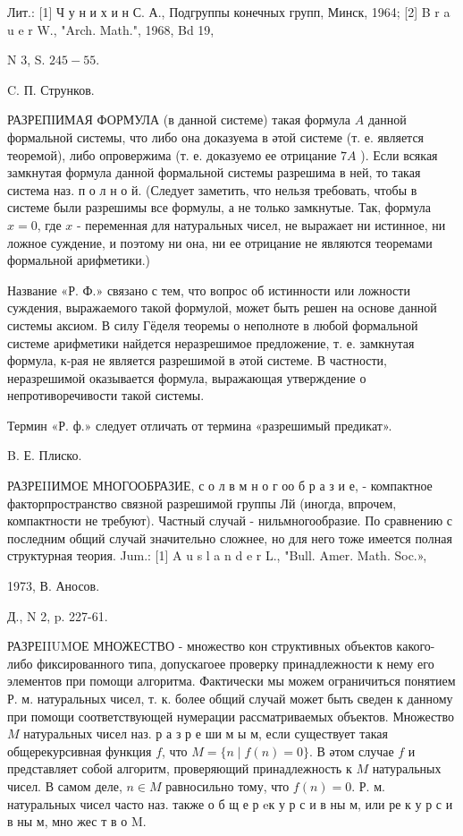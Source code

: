 \documentclass[10pt]{article}
\begin{document}
Лит.: [1] Ч у н и х и н С. А., Подгруппы конечных групп, Минск, 1964; [2] B r a u e r W., "Arch. Math.", 1968, Bd 19,

N 3, S. $245-55$.

C. П. Струнков.



РАЗРЕПІИМАЯ ФОРМУЛА (в данной системе) такая формула $A$ данной формальной системы, что либо она доказуема в әтой системе (т. е. является теоремой), либо опровержима (т. е. доказуемо ее отрицание $7 A$ ). Если всякая замкнутая формула данной формальной системы разрешима в ней, то такая система наз. п о л н о й. (Следует заметить, что нельзя требовать, чтобы в системе были разрешимы все формулы, а не только замкнутые. Так, формула $x=0$, где $x$ - переменная для натуральных чисел, не выражает ни истинное, ни ложное суждение, и поэтому ни она, ни ее отрицание не являются теоремами формальной арифметики.)



Название «Р. Ф.» связано с тем, что вопрос об истинности или ложности суждения, выражаемого такой формулой, может быть решен на основе данной системы аксиом. В силу Гёделя теоремы о неполноте в любой формальной системе арифметики найдется неразрешимое предложение, т. е. замкнутая формула, к-рая не является разрешимой в әтой системе. В частности, неразрешимой оказывается формула, выражающая утверждение о непротиворечивости такой системы.



Термин «Р. ф.» следует отличать от термина «разрешимый предикат».



B. Е. Плиско.



РАЗРЕIIИМОЕ МНОГООБРАЗИЕ, с о л в м н о г оо б р а з и е, - компактное факторпространство связной разрешимой группы Лй (иногда, впрочем, компактности не требуют). Частный случай - нильмногообразие. По сравнению с последним общий случай значительно сложнее, но для него тоже имеется полная структурная теория. Jum.: [1] A u s l a n d e r L., "Bull. Amer. Math. Soc.»,

1973, В. Аносов.

Д., N 2, p. 227-61.



РАЗРЕIIUMОЕ МНОЖЕСТВО - множество кон структивных объектов какого-либо фиксированного типа, допускагоее проверку принадлежности к нему его элементов при помощи алгоритма. Фактически мы можем ограничиться понятием Р. м. натуральных чисел, т. к. более общий случай может быть сведен к данному при помощи соответствующей нумерации рассматриваемых объектов. Множество $M$ натуральных чисел наз. р а з р е ши м ы м, если существует такая общерекурсивная функция $f$, что $M=\{n \mid f(n)=0\}$. В әтом случае $f$ и представляет собой алгоритм, проверяющий принадлежность к $M$ натуральных чисел. В самом деле, $n \in M$ равносильно тому, что $f(n)=0$. Р. м. натуральных чисел часто наз. также о б щ е р eк у р с и в ны м, или ре к у р с и в ны м, мно жес т в $о$ M.
\end{document}
